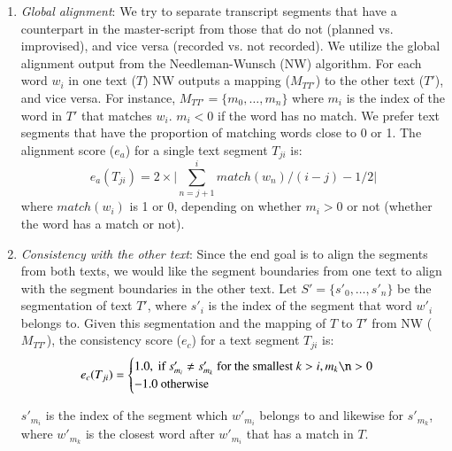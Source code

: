 \begin{enumerate}
\item{\textit{Global alignment}: We try to separate transcript segments that have a counterpart in the master-script from those that do not (planned vs. improvised), and vice versa (recorded vs. not recorded). We utilize the global alignment output from the Needleman-Wunsch (NW) algorithm. For each word $w_i$ in one text ($T$) NW outputs a mapping ($M_{TT'}$) 
to the other text ($T'$), and vice versa. For instance, $M_{TT'} = \{m_0, \dots,m_n\}$ where $m_i$ is the index of the word in  $T'$ that matches $w_i$. $m_i < 0$ if the word has no match. We prefer text segments that have the proportion of matching words close to 0 or 1. The alignment score ($e_a$) for a single text segment $T_{ji}$ is:  
\begin{equation}
e_{a}(T_{ji}) = 2\times\bigg|\sum_{n=j+1}^{i}{match(w_n)}\big/(i-j) - 1/2 \bigg|
\end{equation}
where $match(w_i)$ is 1 or 0, depending on whether $m_i > 0$ or not (whether the word has a match or not).
}
\item{\textit{Consistency with the other text}: Since the end goal is to align the segments from both texts, we would like the segment boundaries from one text to align with the segment boundaries in the other text. Let $S' = \{s'_0, \dots, s'_n\}$ be the segmentation of text $T'$, where $s'_i$ is the index of the segment that word $w'_i$ belongs to. Given this segmentation and the mapping of $T$ to $T'$ from NW  ($M_{TT'}$), the consistency score ($e_c$) for a text segment $T_{ji}$ is:
\begin{equation}
    e_c(T_{ji})= 
\begin{cases}
   1.0, \text{ if } s'_{m_i} \neq s'_{m_k} \text{ for the smallest } k>i, m_k \n>0\\
   -1.0 \text{ otherwise }
\end{cases}
\end{equation}

$s'_{m_i}$ is the index of the segment which $w'_{m_i}$ belongs to and likewise for $s'_{m_k}$, where $w'_{m_k}$ is the closest word after $w'_{m_i}$ that has a match in $T$.
} 


\end{enumerate}




